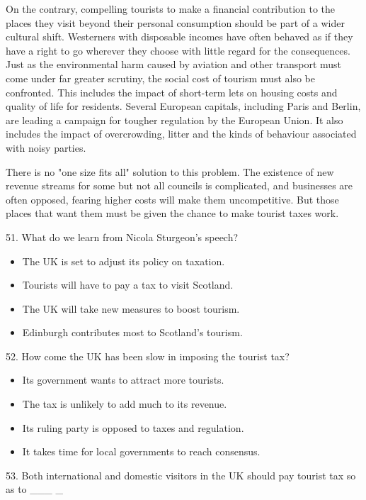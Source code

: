 \documentclass[UTF8,11pt]{ctexart}
\begin{document}
On the contrary, compelling tourists to make a financial contribution to the places they visit beyond their personal consumption should be part of a wider cultural shift. Westerners with disposable incomes have often behaved as if they have a right to go wherever they choose with little regard for the consequences. Just as the environmental harm caused by aviation and other transport must come under far greater scrutiny, the social cost of tourism must also be confronted. This includes the impact of short-term lets on housing costs and quality of life for residents. Several European capitals, including Paris and Berlin, are leading a campaign for tougher regulation by the European Union. It also includes the impact of overcrowding, litter and the kinds of behaviour associated with noisy parties.


There is no "one size fits all" solution to this problem. The existence of new revenue streams for some but not all councils is complicated, and businesses are often opposed, fearing higher costs will make them uncompetitive. But those places that want them must be given the chance to make tourist taxes work.


51. What do we learn from Nicola Sturgeon's speech?


\begin{itemize}[leftmargin=2em,itemsep=.2em,topsep=.4em]\item[A.] The UK is set to adjust its policy on taxation.
\item[B.] Tourists will have to pay a tax to visit Scotland.
\item[C.] The UK will take new measures to boost tourism.
\item[D.] Edinburgh contributes most to Scotland's tourism.
\end{itemize}

52. How come the UK has been slow in imposing the tourist tax?


\begin{itemize}[leftmargin=2em,itemsep=.2em,topsep=.4em]\item[A.] Its government wants to attract more tourists.
\item[B.] The tax is unlikely to add much to its revenue.
\item[C.] Its ruling party is opposed to taxes and regulation.
\item[D.] It takes time for local governments to reach consensus.
\end{itemize}

53. Both international and domestic visitors in the UK should pay tourist tax so as to \_\_\_ \_
\end{document}
